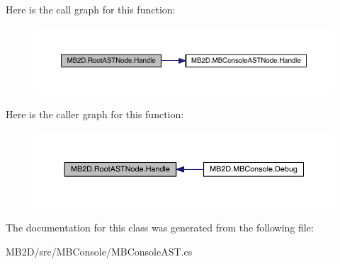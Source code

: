 Here is the call graph for this function\+:\nopagebreak
\begin{figure}[H]
\begin{center}
\leavevmode
\includegraphics[width=350pt]{class_m_b2_d_1_1_root_a_s_t_node_a16290285c34db0660c0a8006fa182d0d_cgraph}
\end{center}
\end{figure}
Here is the caller graph for this function\+:\nopagebreak
\begin{figure}[H]
\begin{center}
\leavevmode
\includegraphics[width=350pt]{class_m_b2_d_1_1_root_a_s_t_node_a16290285c34db0660c0a8006fa182d0d_icgraph}
\end{center}
\end{figure}


The documentation for this class was generated from the following file\+:\begin{DoxyCompactItemize}
\item 
M\+B2\+D/src/\+M\+B\+Console/M\+B\+Console\+A\+S\+T.\+cs\end{DoxyCompactItemize}
